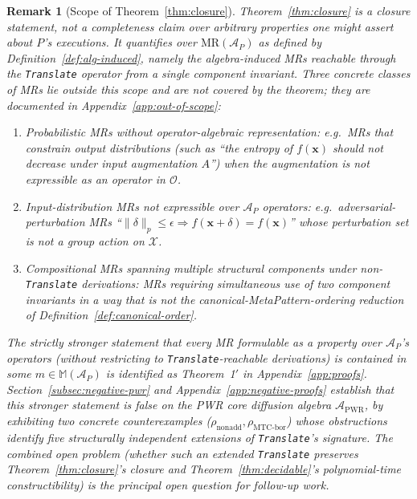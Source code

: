 \documentclass[acmsmall,screen,review]{acmart}
\newtheorem{remark}{Remark}
\begin{document}
\begin{remark}[Scope of Theorem~\ref{thm:closure}]
\label{rem:scope}
Theorem~\ref{thm:closure} is a closure statement, not a completeness claim over arbitrary properties one might assert about $P$'s executions. It quantifies over $\mathrm{MR}(\mathcal{A}_P)$ as defined by Definition~\ref{def:alg-induced}, namely the algebra-induced MRs reachable through the \texttt{Translate} operator from a single component invariant. Three concrete classes of MRs lie outside this scope and are not covered by the theorem; they are documented in Appendix~\ref{app:out-of-scope}:
\begin{enumerate}
    \item \emph{Probabilistic MRs without operator-algebraic representation}: e.g.\ MRs that constrain output \emph{distributions} (such as ``the entropy of $f(\mathbf{x})$ should not decrease under input augmentation $A$'') when the augmentation is not expressible as an operator in $\mathcal{O}$.
    \item \emph{Input-distribution MRs} not expressible over $\mathcal{A}_P$ operators: e.g.\ adversarial-perturbation MRs ``$\| \delta\|_p \le \epsilon \Rightarrow f(\mathbf{x}+\delta) = f(\mathbf{x})$'' whose perturbation set is not a group action on $\mathcal{X}$.
    \item \emph{Compositional MRs spanning multiple structural components under non-\texttt{Translate} derivations}: MRs requiring simultaneous use of two component invariants in a way that is not the canonical-MetaPattern-ordering reduction of Definition~\ref{def:canonical-order}.
\end{enumerate}
The strictly stronger statement that every MR formulable as a property over $\mathcal{A}_P$'s operators (without restricting to \texttt{Translate}-reachable derivations) is contained in some $m \in \mathbb{M}(\mathcal{A}_P)$ is identified as Theorem~1$'$ in Appendix~\ref{app:proofs}. Section~\ref{subsec:negative-pwr} and Appendix~\ref{app:negative-proofs} establish that this stronger statement is false on the PWR core diffusion algebra $\mathcal{A}_{\mathrm{PWR}}$, by exhibiting two concrete counterexamples ($\rho_{\mathrm{nonadd}}, \rho_{\mathrm{MTC\text{-}bor}}$) whose obstructions identify five structurally independent extensions of \texttt{Translate}'s signature. The combined open problem (whether such an extended \texttt{Translate} preserves Theorem~\ref{thm:closure}'s closure and Theorem~\ref{thm:decidable}'s polynomial-time constructibility) is the principal open question for follow-up work.
\end{remark}
\end{document}
